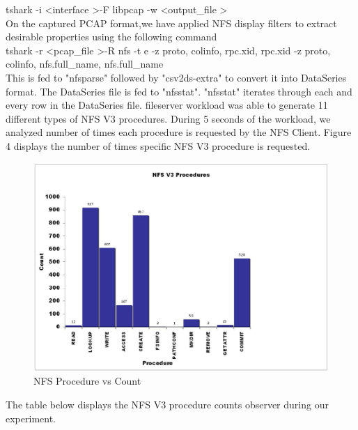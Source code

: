 \documentclass[conference]{IEEEtran}
\begin{document}
\noindent
tshark -i \textless interface \textgreater -F libpcap -w \textless output\_file \textgreater\\

\noindent
On the captured PCAP format,we have applied NFS display filters to extract desirable properties using the following command\\

\noindent
tshark -r \textless pcap\_file \textgreater -R nfs -t e -z proto, colinfo, rpc.xid, rpc.xid -z proto, colinfo, nfs.full\_name, nfs.full\_name \\

\noindent
This is fed to "nfsparse" followed by "csv2ds-extra" to convert it into DataSeries format. The DataSeries file is fed to "nfsstat". "nfsstat" iterates through each and every row in the DataSeries file. fileserver workload was able to generate 11 different types of NFS V3 procedures. During 5 seconds of the workload, we analyzed number of times each procedure is requested by the NFS Client. Figure 4 displays the number of times specific NFS V3 procedure is requested.\\

\noindent
\begin{figure}[htb]
\centering
\includegraphics[width=\linewidth]{procedure_count.jpg}
\caption{NFS Procedure vs Count}
\label{fig:awesome_image}
\end{figure}

The table below displays the NFS V3 procedure counts observer during our experiment.
\end{document}
